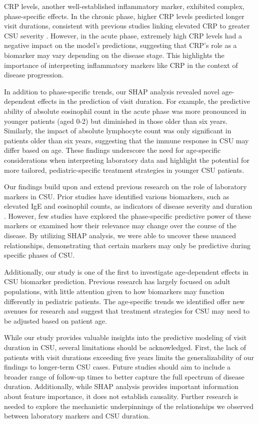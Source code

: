 \documentclass[final,3p,times,authoryear]{elsarticle}
\begin{document}
CRP levels, another well-established inflammatory marker, exhibited complex, phase-specific effects. In the chronic phase, higher CRP levels predicted longer visit durations, consistent with previous studies linking elevated CRP to greater CSU severity \citep{Rabelo-Filardi2013Parameters}. However, in the acute phase, extremely high CRP levels had a negative impact on the model’s predictions, suggesting that CRP’s role as a biomarker may vary depending on the disease stage. This highlights the importance of interpreting inflammatory markers like CRP in the context of disease progression.

In addition to phase-specific trends, our SHAP analysis revealed novel age-dependent effects in the prediction of visit duration. For example, the predictive ability of absolute eosinophil count in the acute phase was more pronounced in younger patients (aged 0-2) but diminished in those older than six years. Similarly, the impact of absolute lymphocyte count was only significant in patients older than six years, suggesting that the immune response in CSU may differ based on age. These findings underscore the need for age-specific considerations when interpreting laboratory data and highlight the potential for more tailored, pediatric-specific treatment strategies in younger CSU patients.

Our findings build upon and extend previous research on the role of laboratory markers in CSU. Prior studies have identified various biomarkers, such as elevated IgE and eosinophil counts, as indicators of disease severity and duration \citep{SanchezBorges2017Factors, Kolkhir2019Eosinopenia}. However, few studies have explored the phase-specific predictive power of these markers or examined how their relevance may change over the course of the disease. By utilizing SHAP analysis, we were able to uncover these nuanced relationships, demonstrating that certain markers may only be predictive during specific phases of CSU.

Additionally, our study is one of the first to investigate age-dependent effects in CSU biomarker prediction. Previous research has largely focused on adult populations, with little attention given to how biomarkers may function differently in pediatric patients. The age-specific trends we identified offer new avenues for research and suggest that treatment strategies for CSU may need to be adjusted based on patient age.

While our study provides valuable insights into the predictive modeling of visit duration in CSU, several limitations should be acknowledged. First, the lack of patients with visit durations exceeding five years limits the generalizability of our findings to longer-term CSU cases. Future studies should aim to include a broader range of follow-up times to better capture the full spectrum of disease duration. Additionally, while SHAP analysis provides important information about feature importance, it does not establish causality. Further research is needed to explore the mechanistic underpinnings of the relationships we observed between laboratory markers and CSU duration.
\end{document}
